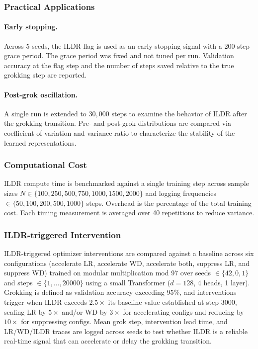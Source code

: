 \documentclass{article}
\begin{document}
\subsubsection{Practical Applications}

\paragraph{Early stopping.}
Across 5 seeds, the ILDR flag is used as an early stopping signal with a 200-step grace period. The grace period was fixed and not tuned per run. 
Validation accuracy at the flag step and the number of steps saved
relative to the true grokking step are reported.

\paragraph{Post-grok oscillation.}
A single run is extended to $30{,}000$ steps to examine the behavior of ILDR
 after the grokking transition.
Pre- and post-grok distributions are compared via coefficient of
variation and variance ratio to characterize the stability of
the learned representations.

\subsubsection{Computational Cost}

ILDR compute time is benchmarked against a single training step
across sample sizes
$N \in \{100, 250, 500, 750, 1000, 1500, 2000\}$ and
logging frequencies $\in \{50, 100, 200, 500, 1000\}$ steps. Overhead is the percentage of the total training cost. Each timing measurement is averaged over 40 repetitions to
reduce variance.




\subsubsection{ILDR-triggered Intervention}

ILDR-triggered optimizer interventions are compared against a baseline across six configurations (accelerate LR, accelerate WD, accelerate both, 
suppress LR, and suppress WD) trained on modular multiplication mod 97 
over seeds $\in \{42, 0, 1\}$ and steps $\in \{1, \ldots, 20000\}$ using a 
small Transformer ($d=128$, 4 heads, 1 layer). Grokking is defined as validation accuracy exceeding 95\%, and interventions trigger when ILDR exceeds  $2.5\times$ its baseline value established at step 3000, scaling LR 
by $5\times$ and/or WD by $3\times$ for accelerating configs and reducing by
$10\times$ for suppressing configs. Mean grok step, intervention lead time, and LR/WD/ILDR traces are logged across seeds to test whether ILDR is a reliable real-time signal that can accelerate or delay the grokking transition. 
\end{document}
